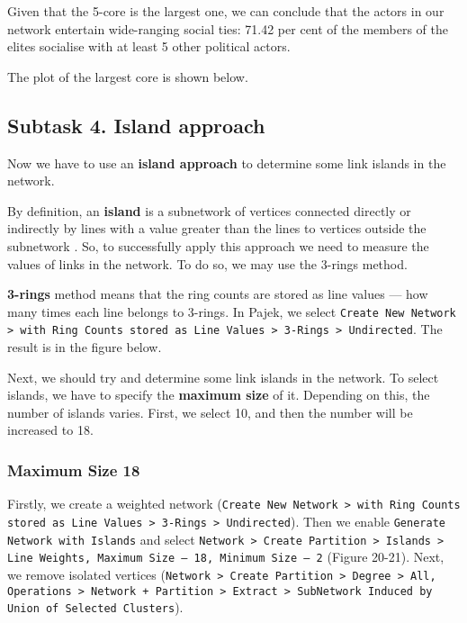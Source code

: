 Given that the 5-core is the largest one, we can conclude that the actors in our network entertain wide-ranging social ties: 71.42 per cent of the members of the elites socialise with at least 5 other political actors. 

The plot of the largest core is shown below.

\FloatBarrier
\clearpage



\subsection{Subtask 4. Island approach}
Now we have to use an \textbf{island approach} to determine some link islands in the network.

By definition, an \textbf{island} is a subnetwork of vertices connected directly or indirectly by lines with a value greater than the lines to vertices outside the subnetwork \cite{de_nooy_2018}. So, to successfully apply this approach we need to measure the values of links in the network. To do so, we may use the 3-rings method. 

\textbf{3-rings} method means that the ring counts are stored as line values — how many times each line belongs to 3-rings. In Pajek, we select \texttt{Create New Network > with Ring Counts stored as Line Values > 3-Rings > Undirected}. The result is in the figure below.


Next, we should try and determine some link islands in the network. To select islands, we have to specify the \textbf{maximum size} of it. Depending on this, the number of islands varies. First, we select 10, and then the number will be increased to 18.

\subsubsection{Maximum Size 18}
Firstly, we create a weighted network (\texttt{Create New Network > with Ring Counts stored as Line Values > 3-Rings > Undirected}). Then we enable \texttt{Generate Network with Islands} and select \texttt{Network > Create Partition > Islands > Line Weights, Maximum Size — 18, Minimum Size — 2} (Figure 20-21). Next, we remove isolated vertices (\texttt{Network > Create Partition > Degree > All, Operations > Network + Partition > Extract > SubNetwork Induced by Union of Selected Clusters}).

